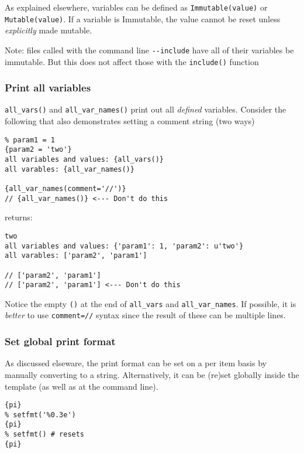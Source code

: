 As explained elsewhere, variables can be defined as
\texttt{Immutable(value)} or \texttt{Mutable(value)}. If a variable is
Immutable, the value cannot be reset unless \emph{explicitly} made
mutable.

Note: files called with the command line \texttt{-\/-include} have all
of their variables be immutable. But this does not affect those with the
\texttt{include()} function

\subsubsection{Print all variables}\label{print-all-variables}

\texttt{all\_vars()} and \texttt{all\_var\_names()} print out all
\emph{defined} variables. Consider the following that also demonstrates
setting a comment string (two ways)

\begin{verbatim}
% param1 = 1
{param2 = 'two'}
all variables and values: {all_vars()}
all varables: {all_var_names()}

{all_var_names(comment='//')}
// {all_var_names()} <--- Don't do this
\end{verbatim}

returns:

\begin{verbatim}
two
all variables and values: {'param1': 1, 'param2': u'two'}
all varables: ['param2', 'param1']

// ['param2', 'param1']
// ['param2', 'param1'] <--- Don't do this
\end{verbatim}

Notice the empty \texttt{()} at the end of \texttt{all\_vars} and
\texttt{all\_var\_names}. If possible, it is \emph{better} to use
\texttt{comment=\textquotesingle{}//\textquotesingle{}} syntax since the
result of these can be multiple lines.

\subsubsection{Set global print format}\label{set-global-print-format}

As discussed elseware, the print format can be set on a per item basis
by manually converting to a string. Alternatively, it can be (re)set
globally inside the template (as well as at the command line).

\begin{verbatim}
{pi}
% setfmt('%0.3e')
{pi}
% setfmt() # resets
{pi}
\end{verbatim}

